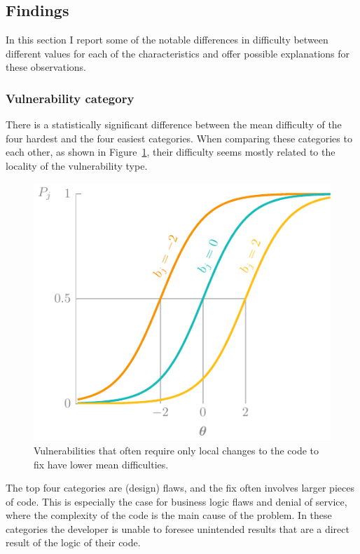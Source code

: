 \subsection{Findings}
In this section I report some of the notable differences in difficulty between different values for each of the characteristics and offer possible explanations for these observations.

\subsubsection{Vulnerability category}
There is a statistically significant difference between the mean difficulty of the four hardest and the four easiest categories.
When comparing these categories to each other, as shown in Figure~\ref{fig:cats1}, their difficulty seems mostly related to the locality of the vulnerability type.

\begin{figure}
    \centering
    \includegraphics[page=20]{03-education/figures/tikzfigures.pdf}
    \caption[Difficulty of bugs versus flaws]{Vulnerabilities that often require only local changes to the code to fix have lower mean difficulties.}
    \label{fig:cats1}
\end{figure}

The top four categories are (design) \glspl{flaw}, and the fix often involves larger pieces of code.
This is especially the case for business logic flaws and denial of service, where the complexity of the code is the main cause of the problem.
In these categories the developer is unable to foresee unintended results that are a direct result of the logic of their code.

